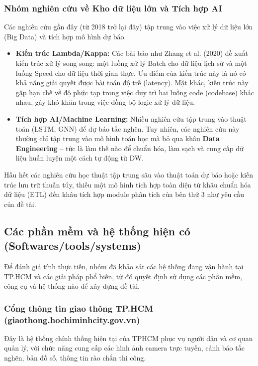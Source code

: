 \subsubsection{Nhóm nghiên cứu về Kho dữ liệu lớn và Tích hợp AI}

Các nghiên cứu gần đây (từ 2018 trở lại đây) tập trung vào việc xử lý dữ liệu lớn (Big Data) và tích hợp mô hình dự báo.

\begin{itemize}
    \item \textbf{Kiến trúc Lambda/Kappa:} Các bài báo như Zhang et al. (2020) đề xuất kiến trúc xử lý song song: một luồng xử lý Batch cho dữ liệu lịch sử và một luồng Speed cho dữ liệu thời gian thực. Ưu điểm của kiến trúc này là nó có khả năng giải quyết được bài toán độ trễ (latency). Mặt khác, kiến trúc này gặp hạn chế về độ phức tạp trong việc duy trì hai luồng code (codebase) khác nhau, gây khó khăn trong việc đồng bộ logic xử lý dữ liệu.
    
    \item \textbf{Tích hợp AI/Machine Learning:} Nhiều nghiên cứu tập trung vào thuật toán (LSTM, GNN) để dự báo tắc nghẽn. Tuy nhiên, các nghiên cứu này thường chỉ tập trung vào mô hình toán học mà bỏ qua khâu \textbf{Data Engineering} – tức là làm thế nào để chuẩn hóa, làm sạch và cung cấp dữ liệu huấn luyện một cách tự động từ DW.
\end{itemize}

Hầu hết các nghiên cứu học thuật tập trung sâu vào thuật toán dự báo hoặc kiến trúc lưu trữ thuần túy, thiếu một mô hình tích hợp toàn diện từ khâu chuẩn hóa dữ liệu (ETL) đến khâu tích hợp module phân tích của bên thứ 3 như yêu cầu của đề tài.

\subsection{Các phần mềm và hệ thống hiện có (Softwares/tools/systems)}

Để đánh giá tính thực tiễn, nhóm đã khảo sát các hệ thống đang vận hành tại TP.HCM và các giải pháp phổ biến, từ đó quyết định sử dụng các phần mềm, công cụ và hệ thống nào để xây dựng đề tài.

\subsubsection{Cổng thông tin giao thông TP.HCM (giaothong.hochiminhcity.gov.vn)}

Đây là hệ thống chính thống hiện tại của TPHCM phục vụ người dân và cơ quan quản lý, với chức năng cung cấp các hình ảnh camera trực tuyến, cảnh báo tắc nghẽn, bản đồ số, thông tin rào chắn thi công.

